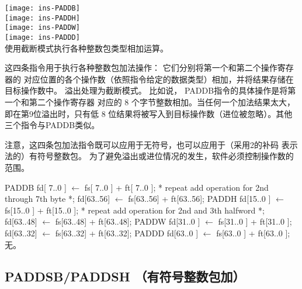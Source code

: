 \begin{instructionblk}
  \texttt{[image: ins-PADDB]} \\
  \texttt{[image: ins-PADDH]} \\
  \texttt{[image: ins-PADDW]} \\
  \texttt{[image: ins-PADDD]} \\
  {使用截断模式执行各种整数包类型相加运算。}
  {这四条指令用于执行各种整数包加法操作： 它们分别将第一个和第二个操作寄存器的
  对应位置的各个操作数（依照指令给定的数据类型）相加，并将结果存储在目标操作数中。
  溢出处理为截断模式。 比如说， PADDB指令的具体操作是将第一个和第二个操作寄存器
  对应的 8 个字节整数相加。当任何一个加法结果太大，即在第9位溢出时，只有低 8
  位结果将被写入到目标操作数（进位被忽略）。其他三个指令与PADDB类似。
  
  注意，这四条包加法指令既可以应用于无符号，也可以应用于（采用2的补码
  表示法的）有符号整数包。 为了避免溢出或进位情况的发生，软件必须控制操作数的范围。}
  {PADDB \narrownewline
  fd[ 7..0 ] $\leftarrow$ fs[ 7..0 ] + ft[ 7..0 ]; \narrownewline
  * repeat add operation for 2nd through 7th byte *; \narrownewline
  fd[63..56] $\leftarrow$ fs[63..56] + ft[63..56]; \narrownewline \narrownewline
  PADDH \narrownewline
  fd[15..0 ] $\leftarrow$ fs[15..0 ] + ft[15..0 ]; \narrownewline
  * repeat add operation for 2nd and 3th halfword *; \narrownewline
  fd[63..48] $\leftarrow$ fs[63..48] + ft[63..48]; \narrownewline \narrownewline
  PADDW \narrownewline
  fd[31..0 ] $\leftarrow$ fs[31..0 ] + ft[31..0 ]; \narrownewline
  fd[63..32] $\leftarrow$ fs[63..32] + ft[63..32]; \narrownewline \narrownewline
  PADDD \narrownewline
  fd[63..0 ] $\leftarrow$ fs[63..0 ] + ft[63..0 ];}
  {无。}
\end{instructionblk}

\subsection{PADDSB/PADDSH （有符号整数包加）}

